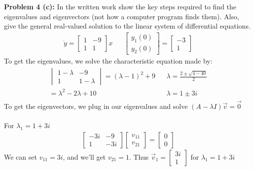 \documentclass[12pt]{article}
\begin{document}
\newpage 


\noindent \textbf{Problem 4 (c): }In the written work show the key steps required to find the eigenvalues and eigenvectors (not how a computer program finds them). Also, give the general real-valued solution to the linear system of differential equations.
\begin{align*}
\dot{y} = 
\begin{bmatrix}
1 & -9 \\ 1 & 1
\end{bmatrix}
x 
&& 
\begin{bmatrix}
y_1(0) \\ y_2(0)
\end{bmatrix}
= 
\begin{bmatrix}
-3 \\ 1
\end{bmatrix}
\end{align*}
To get the eigenvalues, we solve the characteristic equation made by:
\begin{align*}
\begin{vmatrix}
1 - \lambda & -9 \\
1 & 1 - \lambda 
\end{vmatrix}
= (\lambda - 1)^2 + 9 && \lambda = \frac{2 \pm \sqrt{4 - 40}}{2} \\
= \lambda^2 - 2\lambda + 10 &&  \lambda = 1 \pm 3i\\
\end{align*}
To get the eigenvectors, we plug in our eigenvalues and solve $(A - \lambda I)\vec{v} = \vec{0}$
\\ \\
For $\lambda_1 = 1 + 3i$
\begin{align*}
\begin{bmatrix}
-3i & -9 \\ 1 & -3i
\end{bmatrix}
\begin{bmatrix}
v_{11} \\ v_{21}
\end{bmatrix}
= 
\begin{bmatrix}
0 \\ 0
\end{bmatrix}
\end{align*} 
We can set $v_{11} = 3i$, and we'll get $v_{21} = 1$. Thus $\vec{v}_1 = \begin{bmatrix}	3i \\ 1	\end{bmatrix}$ for $\lambda_1 = 1 + 3i$
\\ \\ 
\end{document}
